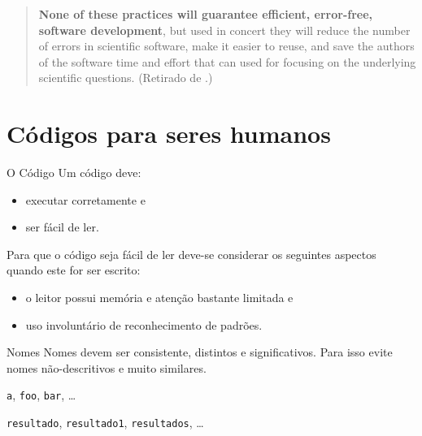 \documentclass[11pt]{beamer}
\begin{document}
\begin{frame}
    \begin{quotation}
        \textbf<2>{None of these practices will guarantee efficient, error-free, software
        development}, but used in concert they will reduce the number of
        errors in scientific software, make it easier to reuse, and save the
        authors of the software time and effort that can used for focusing on
        the underlying scientific questions. (Retirado de
        \cite{Aruliah-2012-Best}.)
    \end{quotation}
\end{frame}

\section{Códigos para seres humanos}
\begin{frame}{O Código}
    Um código deve:
    \begin{itemize}
        \item executar corretamente e
        \item ser fácil de ler.
    \end{itemize}

    \pause
    Para que o código seja fácil de ler deve-se considerar os seguintes
    aspectos quando este for ser escrito:
    \begin{itemize}
        \item o leitor possui memória e atenção bastante limitada e
        \item uso involuntário de reconhecimento de padrões.
    \end{itemize}
\end{frame}

\begin{frame}[fragile]{Nomes}
    Nomes devem ser consistente, distintos e significativos. Para isso evite
    nomes não-descritivos e muito similares.

    \pause
    \begin{example}
        \verb+a+, \verb+foo+, \verb+bar+, \ldots
    \end{example}

    \pause
    \begin{example}
        \verb+resultado+, \verb+resultado1+, \verb+resultados+, \ldots
    \end{example}
\end{frame}
\end{document}
